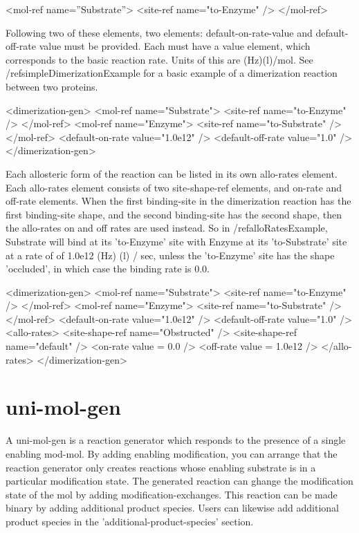\begin{ExampleXML}
<mol-ref name=''Substrate''>
  <site-ref name="to-Enzyme" />
</mol-ref>
\end{ExampleXML}

Following two of these elements, two elements: default-on-rate-value
and default-off-rate value must be provided.  Each must have a value
element, which corresponds to the basic reaction rate.  Units of this
are (Hz)(l)/mol.  See /ref{simpleDimerizationExample} for a basic
example of a dimerization reaction between two proteins.

\begin{ExampleXML}
<dimerization-gen>
  <mol-ref name="Substrate">
    <site-ref name="to-Enzyme" />
  </mol-ref>
  <mol-ref name="Enzyme">
    <site-ref name="to-Substrate" />
  </mol-ref>
  <default-on-rate value="1.0e12" />
  <default-off-rate value="1.0" />
</dimerization-gen>
\end{ExampleXML}

Each allosteric form of the reaction can be listed in its own
allo-rates element.  Each allo-rates element consists of two
site-shape-ref elements, and on-rate and off-rate elements.  When the
first binding-site in the dimerization reaction has the first
binding-site shape, and the second binding-site has the second shape,
then the allo-rates on and off rates are used instead.  So in
/ref{alloRatesExample}, Substrate will bind at its 'to-Enzyme' site
with Enzyme at its 'to-Substrate' site at a rate of of 1.0e12 (Hz) (l)
/ sec, unless the 'to-Enzyme' site has the shape 'occluded', in which
case the binding rate is 0.0.

\begin{ExampleXML} 
<dimerization-gen>
  <mol-ref name="Substrate">
    <site-ref name="to-Enzyme" />
  </mol-ref>
  <mol-ref name="Enzyme">
    <site-ref name="to-Substrate" />
  </mol-ref>
  <default-on-rate value="1.0e12" />
  <default-off-rate value="1.0" />
  <allo-rates>
    <site-shape-ref name="Obstructed" />
    <site-shape-ref name="default" />
    <on-rate value = 0.0 />
    <off-rate value = 1.0e12 />
  </allo-rates>
</dimerization-gen>
 \end{ExampleXML}


\section{uni-mol-gen}
A uni-mol-gen is a reaction generator which responds to the presence
of a single enabling mod-mol.  By adding enabling modification, you
can arrange that the reaction generator only creates reactions whose
enabling substrate is in a particular modification state.  The
generated reaction can ghange the modification state of the mol by
adding modification-exchanges.  This reaction can be made
binary by adding additional product species.  Users can likewise add
additional product species in the 'additional-product-species'
section.  

